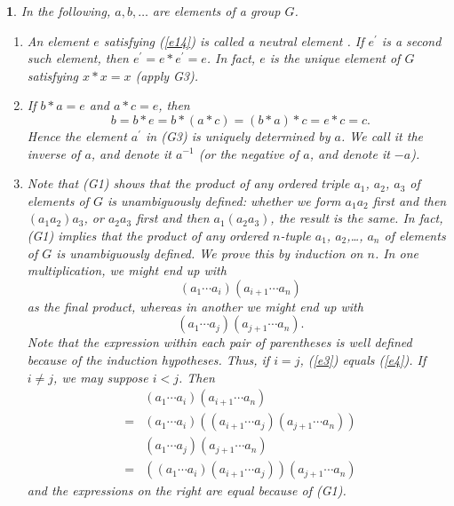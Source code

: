 \documentclass[a4paper,11pt,final,openany]{memoir}%
\newtheorem{plain}[X]{}
\theoremstyle{nonumberplain}
\begin{document}
\begin{plain}
\label{bd2}In the following, $a,b,\ldots$ are elements of a group $G$.

\begin{enumerate}
\item An element $e$ satisfying (\ref{e14}) is called a \emph{neutral element}%
%
. If $e^{\prime}$ is a second such element, then $e^{\prime}=e\ast e^{\prime
}=e$. In fact, $e$ is the unique element of $G$ satisfying $x\ast x=x$ (apply G3).

\item If $b\ast a=e$ and $a\ast c=e$, then
\[
b=b\ast e=b\ast(a\ast c)=(b\ast a)\ast c=e\ast c=c.
\]
Hence the element $a^{\prime}$ in (G3) is uniquely determined by $a$. We call
it the \emph{inverse\/}%
of $a$, and denote it $a^{-1}$ (or the \emph{negative\/}%
of $a$, and denote it $-a$).

\item Note that (G1) shows that the product of any ordered triple $a_{1}$,
$a_{2}$, $a_{3}$ of elements of $G$ is unambiguously defined: whether we form
$a_{1}a_{2}$ first and then $(a_{1}a_{2})a_{3}$, or $a_{2}a_{3}$ first and
then $a_{1}(a_{2}a_{3})$, the result is the same. In fact, (G1) implies that
the product of any ordered $n$-tuple $a_{1}$, $a_{2}$,\ldots, $a_{n}$ of
elements of $G$ is unambiguously defined. We prove this by induction on $n$.
In one multiplication, we might end up with%
\begin{equation}
(a_{1}\cdots a_{i})(a_{i+1}\cdots a_{n}) \label{e3}%
\end{equation}
as the final product, whereas in another we might end up with%
\begin{equation}
(a_{1}\cdots a_{j})(a_{j+1}\cdots a_{n}). \label{e4}%
\end{equation}
Note that the expression within each pair of parentheses is well defined
because of the induction hypotheses. Thus, if $i=j$, (\ref{e3}) equals
(\ref{e4}). If $i\neq j$, we may suppose $i<j$. Then%
\begin{align*}
  &(a_{1}\cdots a_{i})(a_{i+1}\cdots a_{n}) \\
  =&(a_{1}\cdots a_{i})\left(
(a_{i+1}\cdots a_{j})(a_{j+1}\cdots a_{n})\right) \\
 &(a_{1}\cdots a_{j})(a_{j+1}\cdots a_{n})  \\
  =&\left(  (a_{1}\cdots
a_{i})(a_{i+1}\cdots a_{j})\right)  (a_{j+1}\cdots a_{n})
\end{align*}
and the expressions on the right are equal because of (G1).


\end{enumerate}
\end{plain}
\end{document}
